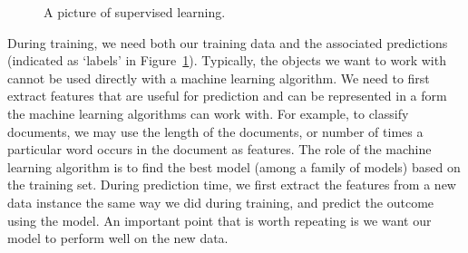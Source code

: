 \begin{figure}
  \caption{
    A picture of supervised learning.
  }\label{fig:supervised-learning}%
\end{figure}

During training, we need both our training data and
the associated predictions (indicated as `labels' in Figure~\ref{fig:supervised-learning}).
Typically, the objects we want to work with cannot be
used directly with a machine learning algorithm.
We need to first extract features that are useful for prediction
and can be represented in a form the machine learning algorithms can work with.
For example, to classify documents,
we may use the length of the documents,
or number of times a particular word occurs in the document as features.
The role of the machine learning algorithm is to find the best model
(among a family of models) based on the training set.
During prediction time,
we first extract the features from a new data instance the same way we did during training,
and predict the outcome using the model.
An important point that is worth repeating is
we want our model to perform well on the new data.%

      \regtable

